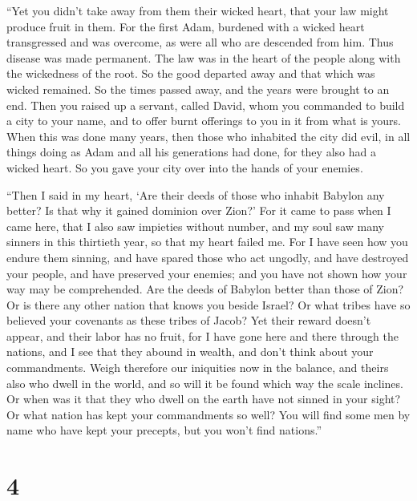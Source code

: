  ``Yet you didn't take away from them their wicked heart,
that your law might produce fruit in them.  For the first
Adam, burdened with a wicked heart transgressed and was overcome, as
were all who are descended from him.  Thus disease was made
permanent. The law was in the heart of the people along with the
wickedness of the root. So the good departed away and that which was
wicked remained.  So the times passed away, and the years
were brought to an end. Then you raised up a servant, called David,
 whom you commanded to build a city to your name, and to
offer burnt offerings to you in it from what is yours. 
When this was done many years, then those who inhabited the city did
evil,  in all things doing as Adam and all his generations
had done, for they also had a wicked heart.  So you gave
your city over into the hands of your enemies.

 ``Then I said in my heart, `Are their deeds of those who
inhabit Babylon any better? Is that why it gained dominion over Zion?'
 For it came to pass when I came here, that I also saw
impieties without number, and my soul saw many sinners in this thirtieth
year, so that my heart failed me.  For I have seen how you
endure them sinning, and have spared those who act ungodly, and have
destroyed your people, and have preserved your enemies; 
and you have not shown how your way may be comprehended. Are the deeds
of Babylon better than those of Zion?  Or is there any
other nation that knows you beside Israel? Or what tribes have so
believed your covenants as these tribes of Jacob?  Yet
their reward doesn't appear, and their labor has no fruit, for I have
gone here and there through the nations, and I see that they abound in
wealth, and don't think about your commandments.  Weigh
therefore our iniquities now in the balance, and theirs also who dwell
in the world, and so will it be found which way the scale inclines.
 Or when was it that they who dwell on the earth have not
sinned in your sight? Or what nation has kept your commandments so well?
 You will find some men by name who have kept your
precepts, but you won't find nations.''

\hypertarget{section-3}{%
\section{4}\label{section-3}}

